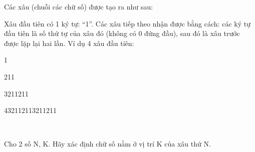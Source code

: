 Các xâu (chuỗi các chữ số) được tạo ra như sau:

Xâu đầu tiên có 1 ký tự: “1”. Các xâu tiếp theo nhận được bằng cách: các ký tự đầu tiên là số thứ tự của xâu đó (không có 0 đứng đầu), sau đó là xâu trước được lặp lại hai lần. Ví dụ 4 xâu đầu tiên:

1

211

3211211

432112113211211

 

Cho 2 số N, K. Hãy xác định chữ số nằm ở vị trí K của xâu thứ N.